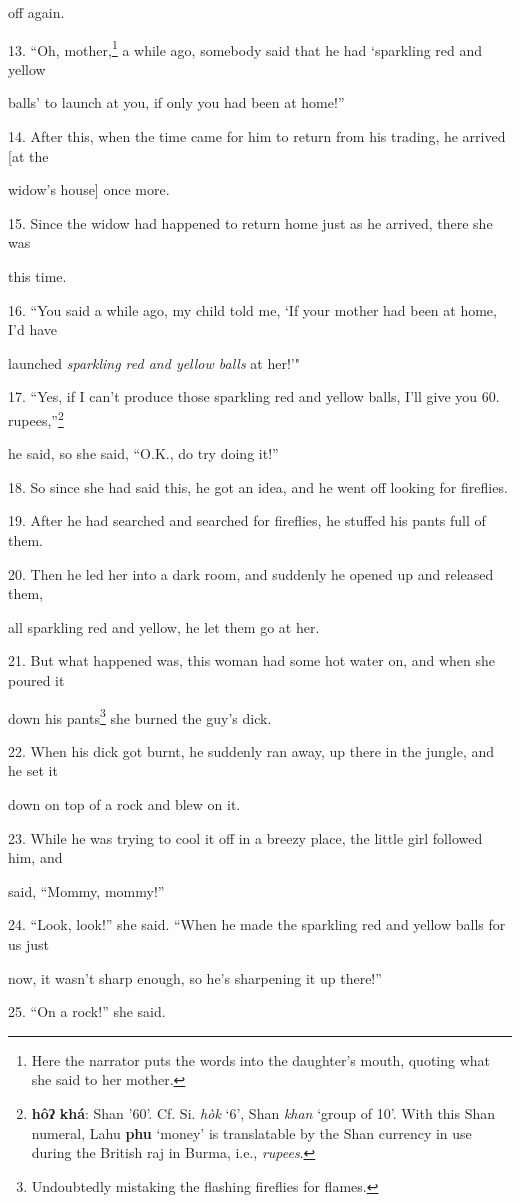 off again.

13. ``Oh, mother,\footnote{Here the narrator puts the words into the daughter's mouth, quoting what she said to her mother.} a while ago, somebody said that he had `sparkling red and
yellow

balls' to launch at you, if only you had been at home!''

14. After this, when the time came for him to return from his trading, he arrived
[at the

widow's house] once more.

15. Since the widow had happened to return home just as he arrived, there she was


this time.

16. ``You said a while ago, my child told me, `If your mother had been at home,
I'd have

launched \textit{sparkling red and yellow balls} at her!'"

17. ``Yes, if I can't produce those sparkling red and yellow balls, I'll give you
60. rupees,''\footnote{\textbf{hôʔ} \textbf{khá}: Shan '60'. Cf. Si. \textit{hòk }`6', Shan \textit{khan} `group of 10'. With this Shan numeral, Lahu \textbf{phu} `money' is translatable by the Shan currency in use during the British raj in Burma, i.e., \textit{rupees}.}

he said, so she said, ``O.K., do try doing it!''

18. So since she had said this, he got an idea, and he went off looking for fireflies.

19. After he had searched and searched for fireflies, he stuffed his pants full
of them.

20. Then he led her into a dark room, and suddenly he opened up and released them,


all sparkling red and yellow, he let them go at her.

21. But what happened was, this woman had some hot water on, and when she poured
it

down his pants\footnote{Undoubtedly mistaking the flashing fireflies for flames.} she burned the guy's dick.

22. When his dick got burnt, he suddenly ran away, up there in the jungle, and
he set it

down on top of a rock and blew on it.

23. While he was trying to cool it off in a breezy place, the little girl followed
him, and

said, ``Mommy, mommy!''

24. ``Look, look!'' she said. ``When he made the sparkling red and yellow balls
for us just

now, it wasn't sharp enough, so he's sharpening it up there!''

25. ``On a rock!'' she said.

